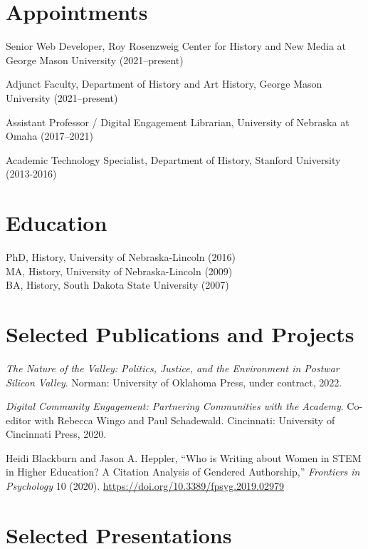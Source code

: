 \hypertarget{appointments}{%
\section{Appointments}\label{appointments}}

Senior Web Developer, Roy Rosenzweig Center for History and New Media at
George Mason University (2021--present)

Adjunct Faculty, Department of History and Art History, George Mason
University (2021--present)

Assistant Professor / Digital Engagement Librarian, University of
Nebraska at Omaha (2017--2021)

Academic Technology Specialist, Department of History, Stanford
University (2013-2016)

\hypertarget{education}{%
\section{Education}\label{education}}

PhD, History, University of Nebraska-Lincoln (2016)\\
MA, History, University of Nebraska-Lincoln (2009)\\
BA, History, South Dakota State University (2007)

\hypertarget{selected-publications-and-projects}{%
\section{Selected Publications and
Projects}\label{selected-publications-and-projects}}

\emph{The Nature of the Valley: Politics, Justice, and the Environment
in Postwar Silicon Valley}. Norman: University of Oklahoma Press, under
contract, 2022.

\emph{Digital Community Engagement: Partnering Communities with the
Academy}. Co-editor with Rebecca Wingo and Paul Schadewald. Cincinnati:
University of Cincinnati Press, 2020.

Heidi Blackburn and Jason A. Heppler, ``Who is Writing about Women in
STEM in Higher Education? A Citation Analysis of Gendered Authorship,''
\emph{Frontiers in Psychology} 10 (2020).
\url{https://doi.org/10.3389/fpsyg.2019.02979}

\hypertarget{selected-presentations}{%
\section{Selected Presentations}\label{selected-presentations}}

